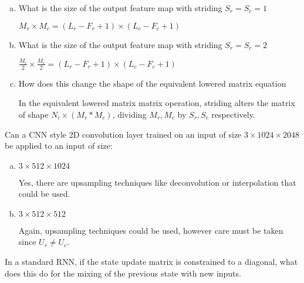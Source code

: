 \documentclass[11pt]{article}
\begin{document}
\begin{enumerate}[(a)]\itemsep0pt
	\item What is the size of the output feature map with striding $S_r=S_c=1$
		\begin{solution}
			$M_r \times M_c = (L_r - F_r + 1)\times(L_c - F_c + 1)$
		\end{solution}
	\item What is the size of the output feature map with striding $S_r=S_c=2$
		\begin{solution}
			$\frac{M_r}{2} \times \frac{M_c}{2} = (L_r - F_r + 1)\times(L_c - F_c + 1)$
		\end{solution}
	\item How does this change the shape of the equivalent lowered matrix
		equation
		\begin{solution}
			In the equivalent lowered matrix matrix operation, striding alters
			the matrix of shape $N_i \times (M_r * M_c)$, dividing $M_r, M_c$
			by $S_r, S_c$ respectively.
		\end{solution}
\end{enumerate}

Can a CNN style 2D convolution layer trained on an input of size
$3 \times 1024 \times 2048$ be applied to an input of size:

\begin{enumerate}[(a)]\itemsep0pt
	\item $3 \times 512 \times1024$
		\begin{solution}
			Yes, there are upsampling techniques like deconvolution or
			interpolation that could be used.
		\end{solution}
	\item $3\times 512 \times512$
		\begin{solution}
			Again, upsampling techniques could be used, however care must be
			taken since $U_r \neq U_c$.
		\end{solution}
\end{enumerate}

In a standard RNN, if the state update matrix is constrained to a diagonal,
what does this do for the mixing of the previous state with new inputs.
\end{document}
